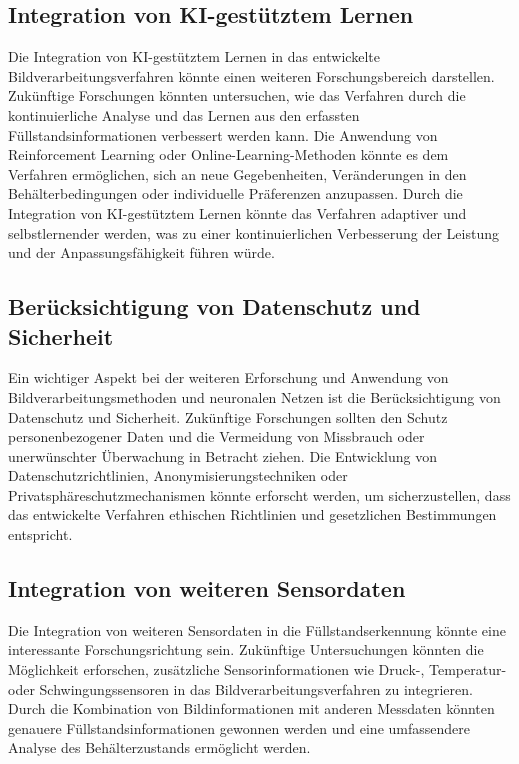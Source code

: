 \subsection{Integration von KI-gestütztem Lernen}

Die Integration von KI-gestütztem Lernen in das entwickelte Bildverarbeitungsverfahren könnte einen weiteren Forschungsbereich darstellen. Zukünftige Forschungen könnten untersuchen, wie das Verfahren durch die kontinuierliche Analyse und das Lernen aus den erfassten Füllstandsinformationen verbessert werden kann. Die Anwendung von Reinforcement Learning oder Online-Learning-Methoden könnte es dem Verfahren ermöglichen, sich an neue Gegebenheiten, Veränderungen in den Behälterbedingungen oder individuelle Präferenzen anzupassen. Durch die Integration von KI-gestütztem Lernen könnte das Verfahren adaptiver und selbstlernender werden, was zu einer kontinuierlichen Verbesserung der Leistung und der Anpassungsfähigkeit führen würde.

\subsection{Berücksichtigung von Datenschutz und Sicherheit}

Ein wichtiger Aspekt bei der weiteren Erforschung und Anwendung von Bildverarbeitungsmethoden und neuronalen Netzen ist die Berücksichtigung von Datenschutz und Sicherheit. Zukünftige Forschungen sollten den Schutz personenbezogener Daten und die Vermeidung von Missbrauch oder unerwünschter Überwachung in Betracht ziehen. Die Entwicklung von Datenschutzrichtlinien, Anonymisierungstechniken oder Privatsphäreschutzmechanismen könnte erforscht werden, um sicherzustellen, dass das entwickelte Verfahren ethischen Richtlinien und gesetzlichen Bestimmungen entspricht.

\subsection{Integration von weiteren Sensordaten} 

Die Integration von weiteren Sensordaten in die Füllstandserkennung könnte eine interessante Forschungsrichtung sein. Zukünftige Untersuchungen könnten die Möglichkeit erforschen, zusätzliche Sensorinformationen wie Druck-, Temperatur- oder Schwingungssensoren in das Bildverarbeitungsverfahren zu integrieren. Durch die Kombination von Bildinformationen mit anderen Messdaten könnten genauere Füllstandsinformationen gewonnen werden und eine umfassendere Analyse des Behälterzustands ermöglicht werden.

